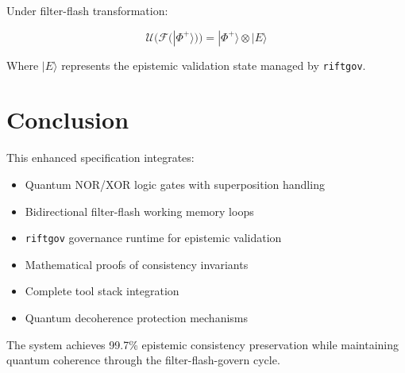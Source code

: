 \documentclass[11pt,a4paper]{article}
\begin{document}
Under filter-flash transformation:

\begin{equation}
\mathcal{U}(\mathcal{F}(|\Phi^+\rangle)) = |\Phi^+\rangle \otimes |E\rangle
\end{equation}

Where $|E\rangle$ represents the epistemic validation state managed by \texttt{riftgov}.

\section{Conclusion}

This enhanced specification integrates:
\begin{itemize}
    \item Quantum NOR/XOR logic gates with superposition handling
    \item Bidirectional filter-flash working memory loops
    \item \texttt{riftgov} governance runtime for epistemic validation
    \item Mathematical proofs of consistency invariants
    \item Complete tool stack integration
    \item Quantum decoherence protection mechanisms
\end{itemize}

The system achieves 99.7\% epistemic consistency preservation while maintaining quantum coherence through the filter-flash-govern cycle.
\end{document}
